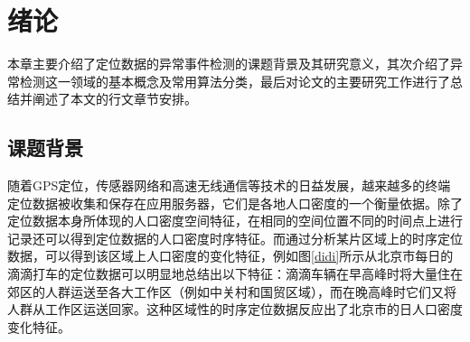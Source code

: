 \documentclass[a4paper,AutoFakeBold,oneside,12pt]{book}
\begin{document}
  
\newpage

  
\newpage

  
\newpage

 
\newpage

\frontmatter\tableofcontents %

\newpage\mainmatter
{} %
\pagestyle{fancy} %


\chapter{绪论}


本章主要介绍了定位数据的异常事件检测的课题背景及其研究意义，其次介绍了异常检测这一领域的基本概念及常用算法分类，最后对论文的主要研究工作进行了总结并阐述了本文的行文章节安排。

\section{课题背景}

随着GPS定位，传感器网络和高速无线通信等技术的日益发展，越来越多的终端定位数据被收集和保存在应用服务器，它们是各地人口密度的一个衡量依据。除了定位数据本身所体现的人口密度空间特征，在相同的空间位置不同的时间点上进行记录还可以得到定位数据的人口密度时序特征。而通过分析某片区域上的时序定位数据，可以得到该区域上人口密度的变化特征，例如图\ref{didi}所示从北京市每日的滴滴打车的定位数据可以明显地总结出以下特征：滴滴车辆在早高峰时将大量住在郊区的人群运送至各大工作区（例如中关村和国贸区域），而在晚高峰时它们又将人群从工作区运送回家。这种区域性的时序定位数据反应出了北京市的日人口密度变化特征。
\end{document}
